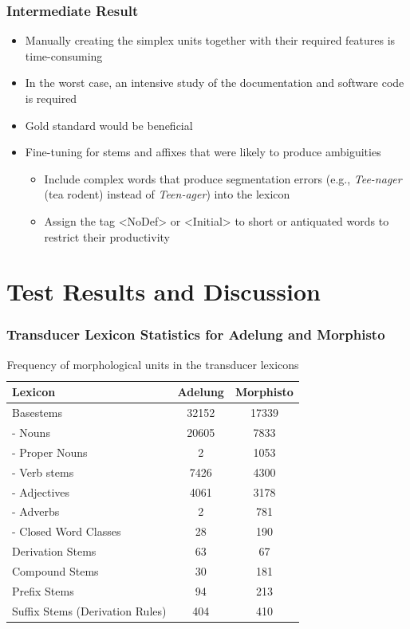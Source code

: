 \documentclass {beamer}
\begin{document}
\frame
{ \frametitle{Intermediate Result}
\begin{itemize} 
\item Manually creating the simplex units together with their required features is time-consuming
\item In the worst case, an intensive study of the documentation and software code is required
\item Gold standard would be beneficial %
\item Fine-tuning for stems and affixes that were likely to produce ambiguities
\begin{itemize}
\item Include complex words that produce segmentation errors (e.g., \textit{Tee-nager} (tea rodent) instead of \textit{Teen-ager})
into the lexicon
\item Assign the tag <NoDef> or <Initial> to short or antiquated words to restrict their productivity
\end{itemize}
\end{itemize}
}

\section{Test Results and Discussion}

\begin{frame}
\frametitle{Transducer Lexicon Statistics for Adelung and Morphisto}
\begin{small}
\begin{table}[h] 
\begin{center}
\begin{tabular}{|l|c|c|}
\hline
\textbf{Lexicon} & \textbf{Adelung} & \textbf{Morphisto} \\
\hline
\hline
Basestems &	32152 &	17339 \\
\hline
-	Nouns 	& 20605 &	7833 \\
-	Proper Nouns &	2	& 1053 \\
-	Verb stems &	7426 &	4300 \\
-	Adjectives  &	4061	& 3178 \\
-	Adverbs 	& 2	& 781 \\
-	Closed Word Classes &	28 &	190 \\
\hline
Derivation Stems & 	63 & 	67 \\
\hline
Compound Stems	& 30	 & 181 \\
\hline
Prefix Stems	& 94	& 213 \\
\hline
Suffix Stems (Derivation Rules) & 	404 & 	410 \\
\hline
\end{tabular}
\caption{Frequency of morphological units in the transducer lexicons}
\end{center}
	  \end{table} 
\end{small}
\end{frame}
\end{document}
